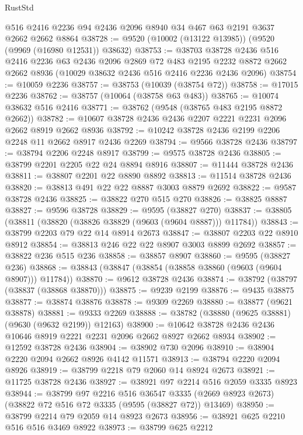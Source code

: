 \begin{lexlean}{RustStd}
\begin{coremodule}
    @516
    @2416
    @2236
    @94
    @2436
    @2096
    @8940
    @34
    @467
    @63
    @2191
    @3637
    @2662
    @2662
    @8864
@38728 := @9520 (@10002 (@13122 @13985)) (@9520 (@9969 (@16980 @12531)) @38632)
@38753 := @38703
    @38728
    @2436
    @516
    @2416
    @2236
    @63
    @2436
    @2096
    @2869
    @72
    @483
    @2195
    @2232
    @8872
    @2662
    @2662
    @8936
    (@10029 @38632 @2436 @516 @2416 @2236 @2436 @2096)
@38754 := @10059 @2236
@38757 := @38753 (@10039 (@38754 @72))
@38758 := @17015 @2236
@38762 := @38757 (@10064 (@38758 @63 @483))
@38765 := @10074 @38632 @516 @2416
@38771 := @38762 (@9548 (@38765 @483 @2195 @8872 @2662))
@38782 := @10607 @38728 @2436 @2436 @2207 @2221 @2231 @2096 @2662 @8919 @2662 @8936
@38792 := @10242 @38728 @2436 @2199 @2206 @2248 @11 @2662 @8917 @2436 @2269
@38794 := @9566 @38728 @2436
@38797 := @38794 @2206 @2248 @8917
@38799 := @9575 @38728 @2436
@38805 := @38799 @2201 @2205 @22 @24 @8894 @8916
@38807 := @11444 @38728 @2436
@38811 := @38807 @2201 @22 @8890 @8892
@38813 := @11514 @38728 @2436
@38820 := @38813 @491 @22 @22 @8887 @3003 @8879 @2692
@38822 := @9587 @38728 @2436
@38825 := @38822 @270 @515 @270
@38826 := @38825 @8887
@38827 := @9596 @38728
@38829 := @9595 (@38827 @270)
@38837 := @38805 (@38811 (@38820 (@38826 @38829 (@9603 (@9604 @8887))) @11784))
@38843 := @38799 @2203 @79 @22 @14 @8914 @2673
@38847 := @38807 @2203 @22 @8910 @8912
@38854 := @38813 @246 @22 @22 @8907 @3003 @8899 @2692
@38857 := @38822 @236 @515 @236
@38858 := @38857 @8907
@38860 := @9595 (@38827 @236)
@38868 := @38843 (@38847 (@38854 (@38858 @38860 (@9603 (@9604 @8907))) @11784))
@38870 := @9612 @38728 @2436
@38874 := @38792 (@38797 (@38837 (@38868 @38870)))
@38875 := @9239 @2199
@38876 := @9435 @38875
@38877 := @38874 @38876
@38878 := @9309 @2269
@38880 := @38877 (@9621 @38878)
@38881 := @9333 @2269
@38888 := @38782 (@38880 (@9625 @38881) (@9630 (@9632 @2199)) @12163)
@38900 := @10642 @38728 @2436 @2436 @10646 @8919 @2221 @2231 @2096 @2662 @8927 @2662 @8934
@38902 := @12592 @38728 @2436
@38904 := @38902 @730 @2096
@38910 := @38904 @2220 @2094 @2662 @8926 @4142 @11571
@38913 := @38794 @2220 @2094 @8926
@38919 := @38799 @2218 @79 @2060 @14 @8924 @2673
@38921 := @11725 @38728 @2436
@38927 := @38921 @97 @2214 @516 @2059 @3335 @8923
@38944 := @38799
    @97
    @2216
    @516
    @36547
    @3335
    (@2669 @8923 @2673)
    (@38822 @72 @516 @72 @3335 (@9595 (@38827 @72)) @13469)
@38950 := @38799 @2214 @79 @2059 @14 @8923 @2673
@38956 := @38921 @625 @2210 @516 @516 @3469 @8922
@38973 := @38799
    @625
    @2212

\end{coremodule}
\end{lexlean}
